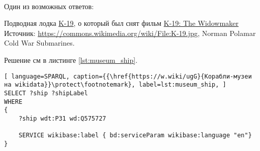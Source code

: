 \begin{task}
	\label{answer:ship_ex_2}
	\\

	Один из возможных ответов:\\
	{
		\setlength{\fboxsep}{0pt}%
		\setlength{\fboxrule}{1pt}%
	}

	Подводная лодка \href{https://ru.wikipedia.org/wiki/К-19}{K-19}, о который был снят фильм \href{https://en.wikipedia.org/wiki/K-19:_The_Widowmaker}{K-19: The Widowmaker} Источник: \href{https://commons.wikimedia.org/wiki/File:K-19.jpg}{https://commons.wikimedia.org/wiki/File:K-19.jpg}, Norman Polamar Cold War Submarines.

\end{task}


\begin{task}
	\label{answer:ship_ex_3}

	Решение см в листинге \ref{lst:museum_ship}.

	\begin{lstlisting}[ language=SPARQL, caption={{\href{https://w.wiki/ugG}{Корабли-музеи на wikidata}}\protect\footnotemark}, label=lst:museum_ship, ]
SELECT ?ship ?shipLabel
WHERE
{
	?ship wdt:P31 wd:Q575727
			   
	SERVICE wikibase:label { bd:serviceParam wikibase:language "en"}
}
	\end{lstlisting}
		

\end{task}
